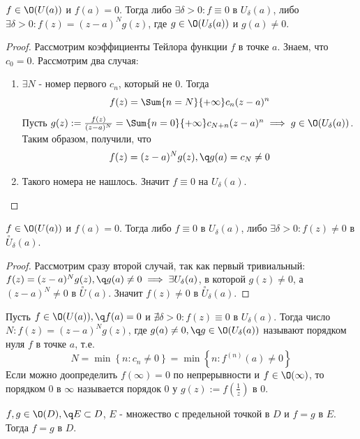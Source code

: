\begin{theorem}
  $f\in\O(U(a))$ и $f(a)=0$. Тогда либо $\exists \delta>0\colon f\equiv 0$ в $U_\delta(a)$, либо $\exists \delta>0\colon f(z)=(z-a)^Ng(z)$, где $g\in\O(U_\delta(a))$ и $g(a)\neq0$. 
\end{theorem}
\begin{proof}
  Рассмотрим коэффициенты Тейлора функции $f$ в точке $a$. Знаем, что $c_0=0$. Рассмотрим два случая:
  \begin{enumerate}
    \item $\exists N$ - номер первого $c_n$, который не 0. Тогда
    \[f(z)=\Sum{n=N}{+\infty}c_n(z-a)^n\]
    Пусть $g(z):=\frac{f(z)}{(z-a)^N}=\Sum{n=0}{+\infty}c_{N+n}(z-a)^n\implies g\in\O(U_\delta(a))$. Таким образом, получили, что
    \[f(z)=(z-a)^Ng(z),\q g(a)=c_N\neq 0\]
    \item Такого номера не нашлось. Значит $f\equiv 0$ на $U_\delta(a)$. 
  \end{enumerate}
\end{proof}
\begin{theorem}
  $f\in\O(U(a))$ и $f(a)=0$. Тогда либо $f\equiv 0$ в $U_\delta(a)$, либо $\exists\delta>0\colon f(z)\neq 0$ в $\overset{\circ}{U}_\delta(a)$. 
\end{theorem}
\begin{proof}
  Рассмотрим сразу второй случай, так как первый тривиальный: 
  $f(z)=(z-a)^Ng(z),\q g(a)\neq 0\implies \exists U_\delta(a)$, в которой $g(z)\neq 0$, а $(z-a)^N\neq 0$ в $\overset{\circ}{U}(a)$. Значит $f(z)\neq 0$ в $\overset{\circ}{U}_\delta(a)$. 
\end{proof}
\begin{definition}
  Пусть $f\in\O(U(a)),\q f(a)=0$ и $\nexists\delta>0\colon f(z)\equiv 0$ в $U_\delta(a)$. Тогда число $N\colon f(z)=(z-a)^Ng(z)$, где $g(a)\neq 0,\q g\in\O(U_\delta(a))$ называют порядком нуля $f$ в точке $a$, т.е.
  \[N=\min \left\{n\colon c_n\neq 0\right\} = \min \left\{n\colon f^{(n)}(a)\neq 0\right\}\]
  Если можно доопределить $f(\infty)=0$ по непрерывности и $f\in\O(\infty)$, то порядком 0 в $\infty$ называется порядок 0 у $g(z):=f(\frac{1}{z})$ в 0. 
\end{definition}
\begin{theorem}
  $f,g\in\O(D),\q E\subset D$, $E$ - множество с предельной точкой в $D$ и $f = g$ в $E$. Тогда $f=g$ в $D$. 
\end{theorem}
